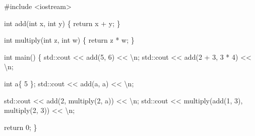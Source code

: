 \documentclass[
  letterpaper,
  DIV=11,
  numbers=noendperiod]{scrreprt}
\newenvironment{Shaded}{\begin{snugshade}}{\end{snugshade}}
\newcommand{\CommentTok}[1]{\textcolor[rgb]{0.37,0.37,0.37}{#1}}
\newcommand{\DecValTok}[1]{\textcolor[rgb]{0.68,0.00,0.00}{#1}}
\newcommand{\ErrorTok}[1]{\textcolor[rgb]{0.68,0.00,0.00}{#1}}
\newcommand{\FunctionTok}[1]{\textcolor[rgb]{0.28,0.35,0.67}{#1}}
\newcommand{\NormalTok}[1]{\textcolor[rgb]{0.00,0.23,0.31}{#1}}
\newcommand{\SpecialCharTok}[1]{\textcolor[rgb]{0.37,0.37,0.37}{#1}}
\newcommand{\StringTok}[1]{\textcolor[rgb]{0.13,0.47,0.30}{#1}}
\begin{document}
\begin{Shaded}
\begin{Highlighting}[]
\CommentTok{\#include \textless{}iostream\textgreater{}}

\NormalTok{int }\FunctionTok{add}\NormalTok{(int x, int y)}
\NormalTok{\{}
\NormalTok{    return x }\SpecialCharTok{+}\NormalTok{ y;}
\NormalTok{\}}

\NormalTok{int }\FunctionTok{multiply}\NormalTok{(int z, int w)}
\NormalTok{\{}
\NormalTok{    return z }\SpecialCharTok{*}\NormalTok{ w;}
\NormalTok{\}}

\NormalTok{int }\FunctionTok{main}\NormalTok{()}
\NormalTok{\{}
\NormalTok{    std}\SpecialCharTok{::}\NormalTok{cout }\SpecialCharTok{\textless{}}\ErrorTok{\textless{}} \FunctionTok{add}\NormalTok{(}\DecValTok{5}\NormalTok{, }\DecValTok{6}\NormalTok{) }\SpecialCharTok{\textless{}}\ErrorTok{\textless{}} \StringTok{\textquotesingle{}}\SpecialCharTok{\textbackslash{}n}\StringTok{\textquotesingle{}}\NormalTok{;}
\NormalTok{    std}\SpecialCharTok{::}\NormalTok{cout }\SpecialCharTok{\textless{}}\ErrorTok{\textless{}} \FunctionTok{add}\NormalTok{(}\DecValTok{2} \SpecialCharTok{+} \DecValTok{3}\NormalTok{, }\DecValTok{3} \SpecialCharTok{*} \DecValTok{4}\NormalTok{) }\SpecialCharTok{\textless{}}\ErrorTok{\textless{}} \StringTok{\textquotesingle{}}\SpecialCharTok{\textbackslash{}n}\StringTok{\textquotesingle{}}\NormalTok{;}

\NormalTok{    int a\{ }\DecValTok{5}\NormalTok{ \};}
\NormalTok{    std}\SpecialCharTok{::}\NormalTok{cout }\SpecialCharTok{\textless{}}\ErrorTok{\textless{}} \FunctionTok{add}\NormalTok{(a, a) }\SpecialCharTok{\textless{}}\ErrorTok{\textless{}} \StringTok{\textquotesingle{}}\SpecialCharTok{\textbackslash{}n}\StringTok{\textquotesingle{}}\NormalTok{;}

\NormalTok{    std}\SpecialCharTok{::}\NormalTok{cout }\SpecialCharTok{\textless{}}\ErrorTok{\textless{}} \FunctionTok{add}\NormalTok{(}\DecValTok{2}\NormalTok{, }\FunctionTok{multiply}\NormalTok{(}\DecValTok{2}\NormalTok{, a)) }\SpecialCharTok{\textless{}}\ErrorTok{\textless{}} \StringTok{\textquotesingle{}}\SpecialCharTok{\textbackslash{}n}\StringTok{\textquotesingle{}}\NormalTok{;}
\NormalTok{    std}\SpecialCharTok{::}\NormalTok{cout }\SpecialCharTok{\textless{}}\ErrorTok{\textless{}} \FunctionTok{multiply}\NormalTok{(}\FunctionTok{add}\NormalTok{(}\DecValTok{1}\NormalTok{, }\DecValTok{3}\NormalTok{), }\FunctionTok{multiply}\NormalTok{(}\DecValTok{2}\NormalTok{, }\DecValTok{3}\NormalTok{)) }\SpecialCharTok{\textless{}}\ErrorTok{\textless{}} \StringTok{\textquotesingle{}}\SpecialCharTok{\textbackslash{}n}\StringTok{\textquotesingle{}}\NormalTok{;}

\NormalTok{    return }\DecValTok{0}\NormalTok{;}
\NormalTok{\}}
\end{Highlighting}
\end{Shaded}
\end{document}
